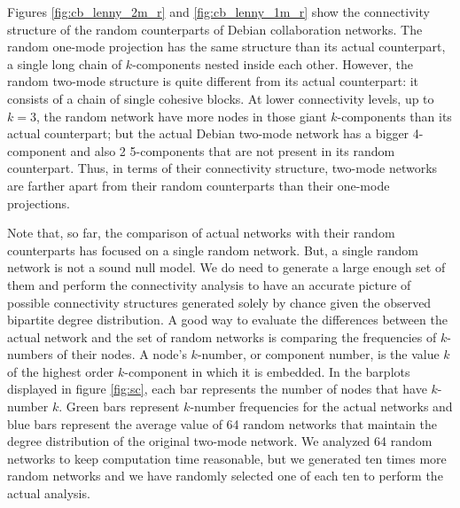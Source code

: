 Figures \ref{fig:cb_lenny_2m_r} and \ref{fig:cb_lenny_1m_r} show the connectivity structure of the random counterparts of Debian collaboration networks. The random one-mode projection has the same structure than its actual counterpart, a single long chain of $k$-components nested inside each other. However, the random two-mode structure is quite different from its actual counterpart: it consists of a chain of single cohesive blocks. At lower connectivity levels, up to $k=3$, the random network have more nodes in those giant $k$-components than its actual counterpart; but the actual Debian two-mode network has a bigger 4-component and also 2 5-components that are not present in its random counterpart. Thus, in terms of their connectivity structure, two-mode networks are farther apart from their random counterparts than their one-mode projections.

Note that, so far, the comparison of actual networks with their random counterparts has focused on a single random network. But, a single random network is not a sound null model. We do need to generate a large enough set of them and perform the connectivity analysis to have an accurate picture of possible connectivity structures generated solely by chance given the observed bipartite degree distribution. A good way to evaluate the differences between the actual network and the set of random networks is comparing the frequencies of $k$-numbers of their nodes. A node's $k$-number, or component number, is the value $k$ of the highest order $k$-component in which it is embedded. In the barplots displayed in figure \ref{fig:sc}, each bar represents the number of nodes that have $k$-number $k$. Green bars represent $k$-number frequencies for the actual networks and blue bars represent the average value of 64 random networks that maintain the degree distribution of the original two-mode network. We analyzed 64 random networks to keep computation time reasonable, but we generated ten times more random networks and we have randomly selected one of each ten to perform the actual analysis.

